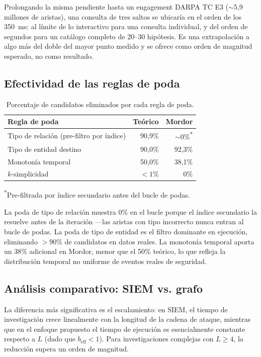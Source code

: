 \documentclass[11pt,a4paper]{article}
\begin{document}
Prolongando la misma pendiente hasta un engagement DARPA TC E3 ($\sim$5,9
millones de aristas), una consulta de tres saltos se ubicaría en el orden de
los 350~ms: al límite de lo interactivo para una consulta individual, y del
orden de segundos para un catálogo completo de 20--30 hipótesis. Es una
extrapolación a algo más del doble del mayor punto medido y se ofrece como
orden de magnitud esperado, no como resultado.

\subsection{Efectividad de las reglas de poda}
\label{sec:podas}
\begin{table}[htbp]
\centering
\caption{Porcentaje de candidatos eliminados por cada regla de poda.}
\begin{tabular}{lrr}
\toprule
\textbf{Regla de poda} & \textbf{Teórico} & \textbf{Mordor}\\
\midrule
Tipo de relación (pre-filtro por índice) & 90,9\% & ${\sim}0\%$\textsuperscript{*}\\
Tipo de entidad destino                  & 90,0\% & 92,3\%\\
Monotonía temporal                         & 50,0\% & 38,1\%\\
$k$-simplicidad                          & $<1\%$ & 0\%\\
\bottomrule
\end{tabular}

\vspace{2mm}
{\footnotesize \textsuperscript{*}Pre-filtrada por índice secundario antes del
bucle de podas.}
\end{table}

La poda de tipo de relación muestra 0\% en el bucle porque el índice secundario
la resuelve antes de la iteración ---las aristas con tipo incorrecto nunca
entran al bucle de podas. La poda de tipo de entidad es el filtro dominante en
ejecución, eliminando $>90\%$ de candidatos en datos reales. La monotonía
temporal aporta un 38\% adicional en Mordor, menor que el 50\% teórico, lo que
refleja la distribución temporal no uniforme de eventos reales de seguridad.

\subsection{Análisis comparativo: SIEM vs. grafo}
La diferencia más significativa es el escalamiento: en SIEM, el tiempo de
investigación crece linealmente con la longitud de la cadena de ataque,
mientras que en el enfoque propuesto el tiempo de ejecución es esencialmente
constante respecto a $L$ (dado que $b_{\mathrm{eff}} < 1$). Para
investigaciones complejas con $L \geq 4$, la reducción supera un orden de
magnitud.
\end{document}
